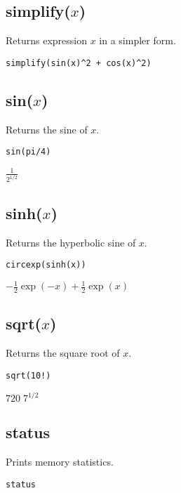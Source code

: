 \subsection*{simplify($x$)}

Returns expression $x$ in a simpler form.

{\color{blue}
\begin{verbatim}
simplify(sin(x)^2 + cos(x)^2)
\end{verbatim}
}


\subsection*{sin($x$)}

Returns the sine of $x$.

{\color{blue}
\begin{verbatim}
sin(pi/4)
\end{verbatim}
}

\noindent
$\displaystyle \frac{1}{2^{1/2}}$

\subsection*{sinh($x$)}

Returns the hyperbolic sine of $x$.

{\color{blue}
\begin{verbatim}
circexp(sinh(x))
\end{verbatim}
}

\noindent
$\displaystyle -\tfrac{1}{2}\exp(-x)+\tfrac{1}{2}\exp(x)$

\subsection*{sqrt($x$)}

Returns the square root of $x$.

{\color{blue}
\begin{verbatim}
sqrt(10!)
\end{verbatim}
}

\noindent
$\displaystyle 720\; 7^{1/2}$

\subsection*{status}

Prints memory statistics.

\bigskip
\noindent
{\color{blue}
\verb$status$
}


